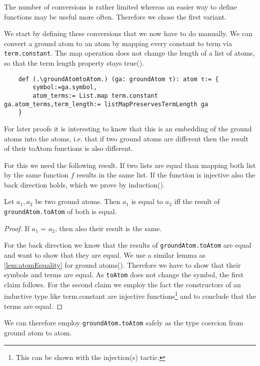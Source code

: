 The number of conversions is rather limited whereas an easier way to define functions may be useful more often. Therefore we chose the first variant. 

We start by defining these conversions that we now have to do manually. We can convert a ground atom to an atom by mapping every constant to term via \lstinline|term.constant|. The map operation does not change the length of a list of atoms, so that the term length property stays true(\listMapPreservesTermLength).

\begin{lstlisting}
    def (.\groundAtomtoAtom.) (ga: groundAtom τ): atom τ:= {
        symbol:=ga.symbol, 
        atom_terms:= List.map term.constant ga.atom_terms,term_length:= listMapPreservesTermLength ga
    }
\end{lstlisting}

For later proofs it is interesting to know that this is an embedding of the ground atoms into the atoms, i.e. that if two ground atoms are different then the result of their toAtom functions is also different.

For this we need the following result. If two lists are equal than mapping both list by the same function $f$ results in the same list. If the function is injective also the back direction holds, which we prove by induction(\listMapInjectiveEquality).

\begin{lemma}[\groundAtomToAtomEquality]
    Let $a_1, a_2$ be two ground atoms. Then $a_1$ is equal to $a_2$ iff the result of \lstinline|groundAtom.toAtom| of both is equal.
\end{lemma}
\begin{proof}
    If $a_1$ = $a_2$, then also their result is the same.

    For the back direction we know that the results of \lstinline|groundAtom.toAtom| are equal and want to show that they are equal. We use a similar lemma as \cref{lem:atomEquality} for ground atoms(\groundAtomEquality). Therefore we have to show that their symbols and terms are equal. As \lstinline|toAtom| does not change the symbol, the first claim follows. For the second claim we employ the fact the constructors of an inductive type like term.constant are injective functions\footnote{This can be shown with the injection(s) tactic.} and \listMapInjectiveEquality to conclude that the terms are equal.
\end{proof}

We can therefore employ \lstinline|groundAtom.toAtom| safely as the type coercion from ground atom to atom.

